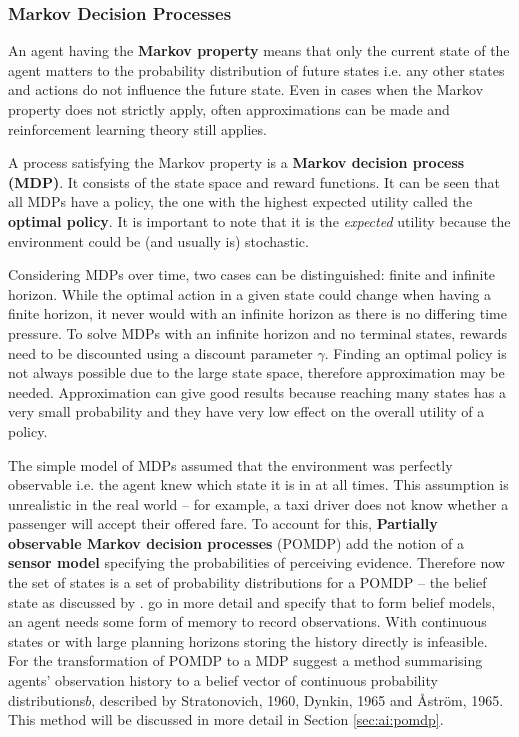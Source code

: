 \subsubsection{Markov Decision Processes}
\label{sec:ai:mdp}

An agent having the \textbf{Markov property} means that only the current state
of the agent matters to the probability distribution of future states i.e. any
other states and actions do not influence the future state. Even in cases when
the Markov property does not strictly apply, often approximations can be made
and reinforcement learning theory still applies.
\parencite{Sutton1998ai+reinforcement}

A process satisfying the Markov property is a
\textbf{Markov decision process (MDP)}. It consists of the state space and
reward functions. It can be seen that all MDPs have a policy, the one with the
highest expected utility called the \textbf{optimal policy}. It is important to
note that it is the \textit{expected} utility because the environment could be
(and usually is) stochastic. \parencite{Russell2010ai+modern}

Considering MDPs over time, two cases can be distinguished: finite and infinite
horizon. While the optimal action in a given state could change when having a
finite horizon, it never would with an infinite horizon as there is no
differing time pressure. To solve MDPs with an infinite horizon and no terminal
states, rewards need to be discounted using a discount parameter \(\gamma\).
Finding an optimal policy is not always possible due to the large state space,
therefore approximation may be needed. Approximation can give good results
because reaching many states has a very small probability and they have very
low effect on the overall utility of a policy. \parencite{Russell2010ai+modern}

The simple model of MDPs assumed that the environment was perfectly observable
i.e. the agent knew which state it is in at all times. This assumption is
unrealistic in the real world -- for example, a taxi driver does not know
whether a passenger will accept their offered fare. To account for this,
\textbf{Partially observable Markov decision processes} (POMDP) add the notion
of a \textbf{sensor model} specifying the probabilities of perceiving evidence.
Therefore now the set of states is a set of probability distributions for a
POMDP -- the belief state as discussed by \textcite{Russell2010ai+modern}.
\textcite{Wiering2012ai+reinforcement} go in more detail and specify that to
form belief models, an agent needs some form of memory to record observations.
With continuous states or with large planning horizons storing the history
directly is infeasible. For the transformation of POMDP to a MDP
\textcite[391-393]{Wiering2012ai+reinforcement} suggest a method summarising
agents' observation history to a belief vector of continuous probability
distributions\(b\), described by Stratonovich, 1960, Dynkin, 1965 and Åström,
1965. This method will be discussed in more detail in Section
\ref{sec:ai:pomdp}.

